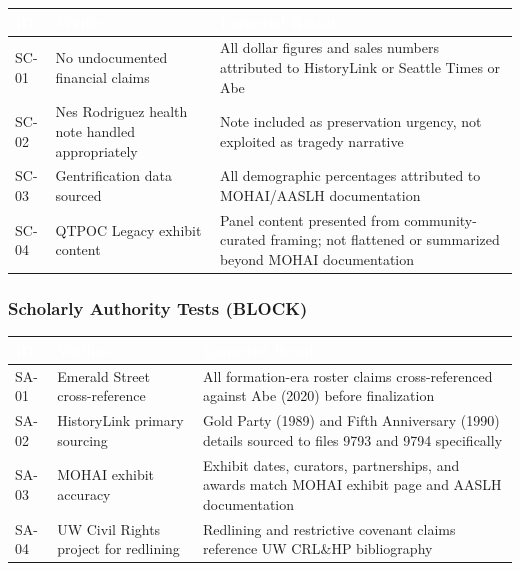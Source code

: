\documentclass[11pt,letterpaper]{article}
\newcommand{\tableheader}[1]{\textbf{\sffamily\textcolor{white}{#1}}}
\begin{document}
\begin{center}
\begin{tabularx}{\textwidth}{L{1.5cm}L{4cm}X}
\toprule
{}
\tableheader{ID} & \tableheader{Verifies} & \tableheader{Expected Result} \\
\midrule
SC-01 & No undocumented financial claims & All dollar figures and sales numbers attributed to HistoryLink or Seattle Times or Abe \\
SC-02 & Nes Rodriguez health note handled appropriately & Note included as preservation urgency, not exploited as tragedy narrative \\
SC-03 & Gentrification data sourced & All demographic percentages attributed to MOHAI/AASLH documentation \\
SC-04 & QTPOC Legacy exhibit content & Panel content presented from community-curated framing; not flattened or summarized beyond MOHAI documentation \\
\bottomrule
\end{tabularx}
\end{center}

\subsubsection{Scholarly Authority Tests (BLOCK)}

\begin{center}
\begin{tabularx}{\textwidth}{L{1.5cm}L{4cm}X}
\toprule
{}
\tableheader{ID} & \tableheader{Verifies} & \tableheader{Expected Result} \\
\midrule
SA-01 & Emerald Street cross-reference & All formation-era roster claims cross-referenced against Abe (2020) before finalization \\
SA-02 & HistoryLink primary sourcing & Gold Party (1989) and Fifth Anniversary (1990) details sourced to files 9793 and 9794 specifically \\
SA-03 & MOHAI exhibit accuracy & Exhibit dates, curators, partnerships, and awards match MOHAI exhibit page and AASLH documentation \\
SA-04 & UW Civil Rights project for redlining & Redlining and restrictive covenant claims reference UW CRL\&HP bibliography \\
\bottomrule
\end{tabularx}
\end{center}
\end{document}
